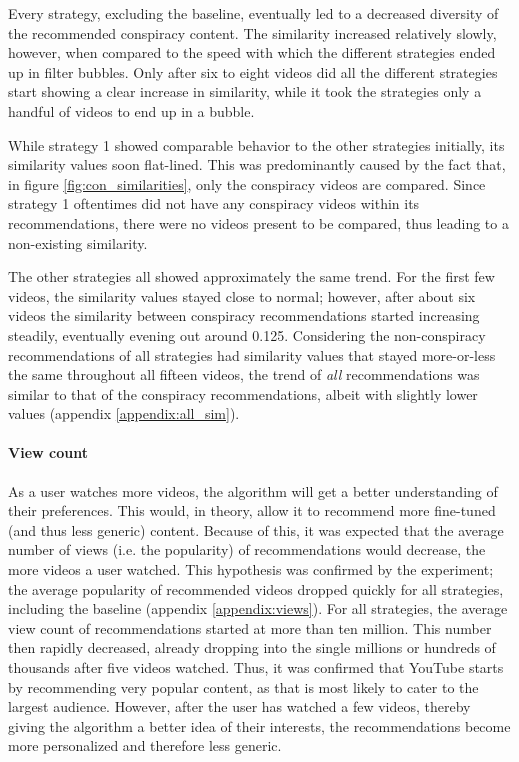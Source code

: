 \documentclass[../main.tex]{subfiles}
\begin{document}
Every strategy, excluding the baseline, eventually led to a decreased diversity of the recommended conspiracy 
content. The similarity increased relatively slowly, however, when compared to the speed with which the 
different strategies ended up in filter bubbles. Only after six to eight videos did all the different 
strategies start showing a clear increase in similarity, while it took the strategies only a handful of videos to end
up in a bubble.

While strategy 1 showed comparable behavior to the other strategies initially, its similarity values soon 
flat-lined. This was predominantly caused by the fact that, in figure \ref{fig:con_similarities}, only the 
conspiracy videos are compared. Since strategy 1 oftentimes did not have any conspiracy videos within its 
recommendations, there were no videos present to be compared, thus leading to a non-existing similarity. 

The other strategies all showed approximately the same trend. For the first few videos, the similarity values 
stayed close to normal; however, after about six videos the similarity between conspiracy recommendations 
started increasing steadily, eventually evening out around 0.125. Considering the non-conspiracy recommendations
of all strategies had similarity values that stayed more-or-less the same throughout all fifteen videos, the 
trend of \textit{all} recommendations was similar to that of the conspiracy recommendations, albeit with 
slightly lower values (appendix \ref{appendix:all_sim}).

\paragraph{View count}
As a user watches more videos, the algorithm will get a better understanding of their preferences. This would, 
in theory, allow it to recommend more fine-tuned (and thus less generic) content. Because of this, it was 
expected that the average number of views (i.e. the popularity) of recommendations would decrease, the more 
videos a user watched. This hypothesis was confirmed by the experiment; the average popularity of recommended
videos dropped quickly for all strategies, including the baseline (appendix \ref{appendix:views}). For all
strategies, the average view count of recommendations started at more than ten million. This number then rapidly
decreased, already dropping into the single millions or hundreds of thousands after five videos watched. Thus,
it was confirmed that YouTube starts by recommending very popular content, as that is most likely to cater to
the largest audience. However, after the user has watched a few videos, thereby giving the algorithm a better
idea of their interests, the recommendations become more personalized and therefore less generic. 
\end{document}
